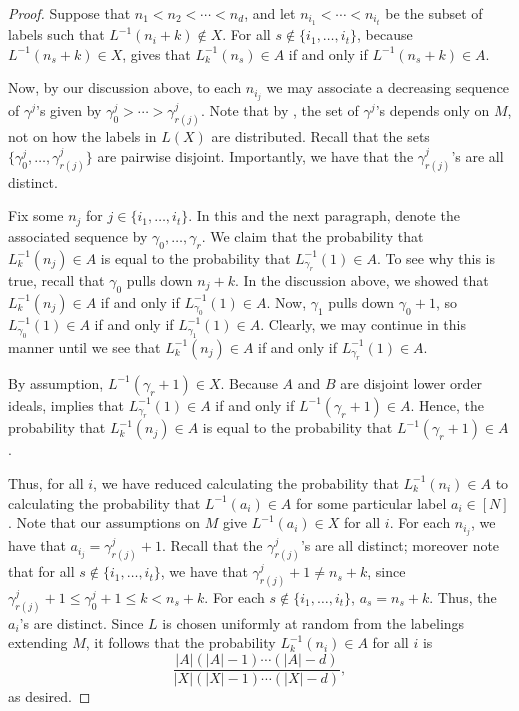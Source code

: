 \documentclass[11pt]{amsart}
\theoremstyle{definition}
\newcommand{\inverse}{^{-1}}
\begin{document}
\begin{proof}
	Suppose that $ n_1<n_2<\cdots<n_d $, and let $ n_{i_1}<\cdots<n_{i_t} $ be the subset of labels such that $ L\inverse(n_{i}+k)\not\in X $. For all $ s\not\in\{i_1,\ldots,i_t\} $, because $ L\inverse(n_s+k)\in X $,  gives that $ L_k\inverse(n_s)\in A $ if and only if $ L\inverse(n_s+k)\in A $.
	
	Now, by our discussion above, to each $ n_{i_j} $ we may associate a decreasing sequence of $ \gamma^j $'s given by $ \gamma^j_0>\cdots>\gamma^j_{r(j)} $. Note that by , the set of $ \gamma^j $'s depends only on $ M $, not on how the labels in $ L(X) $ are distributed. Recall that the sets $ \{\gamma^j_0,\ldots,\gamma^j_{r(j)}\} $ are pairwise disjoint. Importantly, we have that the $ \gamma^j_{r(j)} $'s are all distinct. 
	
	Fix some $ n_{j} $ for $ j\in\{i_1,\ldots,i_t\} $. In this and the next paragraph, denote the associated sequence by $ \gamma_0,\ldots,\gamma_r $. We claim that the probability that $ L_k\inverse(n_{j})\in A $ is equal to the probability that $ L_{\gamma_{r}}\inverse(1)\in A $. To see why this is true, recall that $ \gamma_0 $ pulls down $ n_{j}+k $. In the discussion above, we showed that $ L_k\inverse(n_{j})\in A $ if and only if $ L_{\gamma_{0}}\inverse(1)\in A $. Now, $ \gamma_1 $ pulls down $ \gamma_0+1 $, so $ L_{\gamma_0}\inverse(1)\in A $ if and only if $ L_{\gamma_1}\inverse(1)\in A $. Clearly, we may continue in this manner until we see that $ L_{k}\inverse(n_{j})\in A $ if and only if $ L_{\gamma_{r}}\inverse(1)\in A $. 
	
	By assumption, $ L\inverse(\gamma_{r}+1)\in X $. Because $ A $ and $ B $ are disjoint lower order ideals,  implies that $ L_{\gamma_{r}}\inverse(1)\in A $ if and only if $ L\inverse(\gamma_{r}+1)\in A $. Hence, the probability that $ L_k\inverse(n_{j})\in A $ is equal to the probability that $ L\inverse(\gamma_{r}+1)\in A $.
	
	Thus, for all $ i $, we have reduced calculating the probability that $ L_k\inverse(n_i)\in A $ to calculating the probability that $ L\inverse(a_i)\in A $ for some particular label $ a_i\in[N] $. Note that our assumptions on $ M $ give $ L\inverse(a_i)\in X $ for all $ i $. For each $ n_{i_j} $, we have that $ a_{i_j}=\gamma^j_{r(j)}+1 $. Recall that the $ \gamma_{r(j)}^j $'s are all distinct; moreover note that for all $ s\not\in\{i_1,\ldots,i_t\} $, we have that $ \gamma^j_{r(j)}+1\neq n_s+k $, since $ \gamma^j_{r(j)}+1\leq\gamma^j_0+1\leq k<n_s+k $. For each $ s\not\in\{i_1,\ldots,i_t\} $, $ a_s=n_s+k $. Thus, the $ a_i $'s are distinct. Since $ L $ is chosen uniformly at random from the labelings extending $ M $, it follows that the probability $ L_{k}\inverse(n_i)\in A $ for all $ i $ is \[\frac{|A|(|A|-1)\cdots(|A|-d)}{|X|(|X|-1)\cdots(|X|-d)},\] as desired.	
\end{proof}
\end{document}
